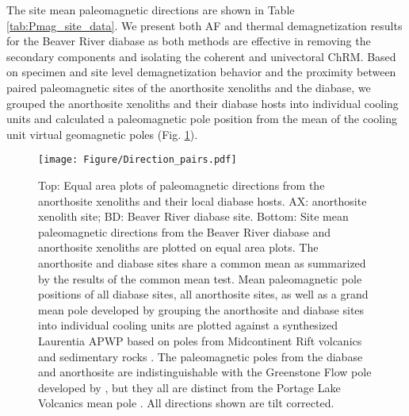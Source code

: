 The site mean paleomagnetic directions are shown in Table \ref{tab:Pmag_site_data}. We present both AF and thermal demagnetization results for the Beaver River diabase as both methods are effective in removing the secondary components and isolating the coherent and univectoral ChRM. Based on specimen and site level demagnetization behavior and the proximity between paired paleomagnetic sites of the anorthosite xenoliths and the diabase, we grouped the anorthosite xenoliths and their diabase hosts into individual cooling units and calculated a paleomagnetic pole position from the mean of the cooling unit virtual geomagnetic poles (Fig. \ref{fig:Direction_pairs}). 

\begin{figure}
\noindent\texttt{[image: Figure/Direction\_pairs.pdf]}
\caption{\small{Top: Equal area plots of paleomagnetic directions from the anorthosite xenoliths and their local diabase hosts. AX: anorthosite xenolith site; BD: Beaver River diabase site. Bottom: Site mean paleomagnetic directions from the Beaver River diabase and anorthosite xenoliths are plotted on equal area plots. The anorthosite and diabase sites share a common mean as summarized by the results of the  common mean test. Mean paleomagnetic pole positions of all diabase sites, all anorthosite sites, as well as a grand mean pole developed by grouping the anorthosite and diabase sites into individual cooling units are plotted against a synthesized Laurentia APWP based on poles from Midcontinent Rift volcanics and sedimentary rocks \cite{Swanson-Hysell2019a}. The paleomagnetic poles from the diabase and anorthosite are indistinguishable with the Greenstone Flow pole developed by , but they all are distinct from the Portage Lake Volcanics mean pole \cite{Swanson-Hysell2019a}. All directions shown are tilt corrected.}}
\label{fig:Direction_pairs}
\end{figure}

